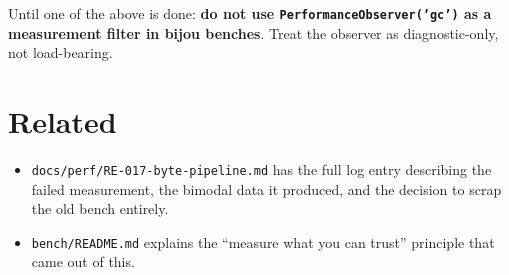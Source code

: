 Until one of the above is done: \textbf{do not use \texttt{P\allowbreak{}e\allowbreak{}r\allowbreak{}f\allowbreak{}o\allowbreak{}r\allowbreak{}m\allowbreak{}a\allowbreak{}n\allowbreak{}c\allowbreak{}e\allowbreak{}O\allowbreak{}b\allowbreak{}s\allowbreak{}e\allowbreak{}r\allowbreak{}v\allowbreak{}e\allowbreak{}r\allowbreak{}(\allowbreak{}'\allowbreak{}g\allowbreak{}c\allowbreak{}'\allowbreak{})} as a measurement filter in bijou benches}. Treat the observer as diagnostic-only, not load-bearing.

\section{Related}\label{record-310-related}

\begin{itemize}
\tightlist
\item
  \texttt{d\allowbreak{}o\allowbreak{}c\allowbreak{}s\allowbreak{}/\allowbreak{}p\allowbreak{}e\allowbreak{}r\allowbreak{}f\allowbreak{}/\allowbreak{}R\allowbreak{}E\allowbreak{}-\allowbreak{}0\allowbreak{}1\allowbreak{}7\allowbreak{}-\allowbreak{}b\allowbreak{}y\allowbreak{}t\allowbreak{}e\allowbreak{}-\allowbreak{}p\allowbreak{}i\allowbreak{}p\allowbreak{}e\allowbreak{}l\allowbreak{}i\allowbreak{}n\allowbreak{}e\allowbreak{}.\allowbreak{}m\allowbreak{}d} has the full log entry describing the failed measurement, the bimodal data it produced, and the decision to scrap the old bench entirely.
\item
  \texttt{b\allowbreak{}e\allowbreak{}n\allowbreak{}c\allowbreak{}h\allowbreak{}/\allowbreak{}R\allowbreak{}E\allowbreak{}A\allowbreak{}D\allowbreak{}M\allowbreak{}E\allowbreak{}.\allowbreak{}m\allowbreak{}d} explains the ``measure what you can trust'' principle that came out of this.
\end{itemize}

